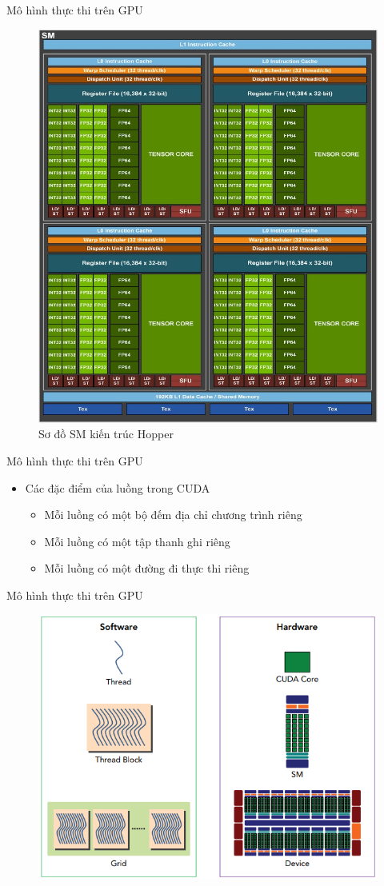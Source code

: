 \documentclass[10pt]{beamer}
\theoremstyle{remark}
\numberwithin{algocf}{section}
\numberwithin{equation}{section}
\numberwithin{dl}{section}
\numberwithin{figure}{section}
\begin{document}
\begin{frame}{Mô hình thực thi trên GPU}
    \begin{figure}[H]
        \centering
        \includegraphics[width=0.45\linewidth]{figures/CUDA/SM_Hopper_Archtecture.jpg}
        \caption{Sơ đồ SM kiến trúc Hopper}
    \end{figure}
\end{frame}

\begin{frame}{Mô hình thực thi trên GPU}
    \begin{itemize}
        \item Các đặc điểm của luồng trong CUDA
        \begin{itemize}
            \item Mỗi luồng có một bộ đếm địa chỉ chương trình riêng
            \item Mỗi luồng có một tập thanh ghi riêng
            \item Mỗi luồng có một đường đi thực thi riêng
        \end{itemize}
    \end{itemize}
\end{frame}

\begin{frame}{Mô hình thực thi trên GPU}
    \begin{figure}[H]
        \centering
        \includegraphics[width=0.7\linewidth]{figures/CUDA/Software_vs_Hardware.png}
    \end{figure}
\end{frame}
\end{document}
